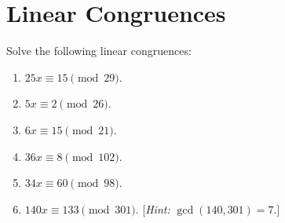 \section{Linear Congruences}

\begin{exercise}
    Solve the following linear congruences:
    \begin{enumerate}
        \item $25x \equiv 15 \pmod{29}$.
        \item $5x \equiv 2 \pmod{26}$.
        \item $6x \equiv 15 \pmod{21}$.
        \item $36x \equiv 8 \pmod{102}$.
        \item $34x \equiv 60 \pmod{98}$.
        \item $140x \equiv 133 \pmod{301}$. [\textit{Hint:} $\gcd(140, 301) = 7$.]
    \end{enumerate}
\end{exercise}

